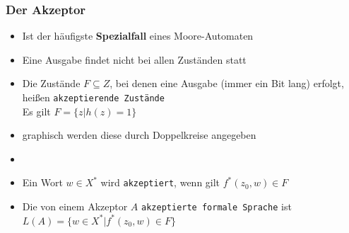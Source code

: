 \begin{frame}
   \frametitle{Der Akzeptor}

   \begin{itemize}
     \item \vspace{-1.4em} Ist der häufigste \textbf{Spezialfall} eines Moore-Automaten
     \item Eine Ausgabe findet nicht bei allen Zuständen statt \pause
     \item Die Zustände $F \subseteq Z$, bei denen eine Ausgabe (immer ein Bit lang) erfolgt, heißen \texttt{akzeptierende Zustände} \\
     Es gilt $F=\{z|h(z)=1\}$ \pause
     \item graphisch werden diese durch Doppelkreise angegeben
     		\begin{center}
      	\end{center} \pause
     \item[]
     \item Ein Wort $w\in X^*$ wird \texttt{akzeptiert}, wenn gilt $f^*(z_0,w)\in F$
     \item Die von einem Akzeptor $A$ \texttt{akzeptierte formale Sprache} ist $L(A)=\{w \in X^* |f^*(z_0,w)\in F\}$
   \end{itemize}
 \end{frame}

